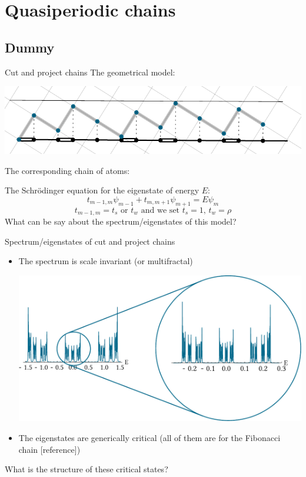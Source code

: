 \documentclass[xcolor=x11names,compress,professionalfonts]{beamer}
\renewcommand{\(}{\begin{columns}}
\renewcommand{\)}{\end{columns}}
\newcommand{\<}[1]{\begin{column}{#1}}
\renewcommand{\>}{\end{column}}
\begin{document}
\section{Quasiperiodic chains}
\subsection{Dummy}

\begin{frame}{Cut and project chains}
		The geometrical model:
		
		{\centering
		\includegraphics[scale=0.8]{img/cut_and_project_Fibonacci.pdf}
		
		}
		
		The corresponding chain of atoms:
		
		{\centering
		
		
		}
The Schrödinger equation for the eigenstate of energy $E$:
\[
	 t_{m-1,m} \psi_{m-1} + t_{m,m+1}\psi_{m+1} = E \psi_{m}
\]
\[
	t_{m-1,m} = t_s \text{~or~} t_w \text{~and we set $t_s = 1$, $t_w = \rho$}
\]
What can be say about the spectrum/eigenstates of this model?
\end{frame}

\begin{frame}{Spectrum/eigenstates of cut and project chains}
\begin{itemize}
	\item The spectrum is scale invariant (or multifractal)
	
{\centering
\includegraphics[scale=.5]{img/ldos.pdf}

}
	\item The eigenstates are generically critical (all of them are for the Fibonacci chain [reference])
\end{itemize}
What is the structure of these critical states?
\end{frame}
\end{document}
